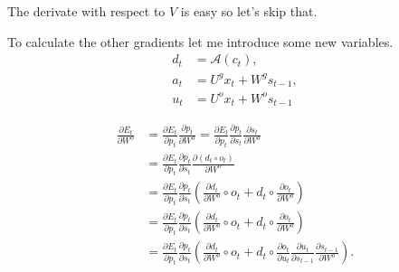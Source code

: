 \documentclass[12pt]{article}
\numberwithin{equation}{section}
\begin{document}
The derivate with respect to \(V\) is easy so let's skip that.

To calculate the other gradients let me introduce some new variables.
\begin{align}
d_t &= \mathcal{A}(c_t), \\
a_t &= U^gx_t + W^g s_{t-1}, \\
u_t &= U^o x_t + W^o s_{t-1}
\end{align}

\begin{align}
\frac{\partial E_t}{\partial W^o} &= \frac{\partial E_t}{\partial p_t}\frac{\partial p_t}{\partial W^o} = \frac{\partial E_t}{\partial p_t} \frac{\partial p_t}{\partial s_t}\frac{\partial s_t}{\partial W^o} \nonumber\\
&= \frac{\partial E_t}{\partial p_t} \frac{\partial p_t}{\partial s_t}\frac{\partial (d_t \circ o_t)}{\partial W^o} \nonumber \\
&= \frac{\partial E_t}{\partial p_t} \frac{\partial p_t}{\partial s_t}\left(\frac{\partial d_t }{\partial W^o}\circ o_t + d_t \circ \frac{\partial o_t}{\partial W^o}\right) \nonumber \\
&= \frac{\partial E_t}{\partial p_t} \frac{\partial p_t}{\partial s_t}\left(\frac{\partial d_t}{\partial W^o}\circ o_t + d_t \circ \frac{\partial o_t}{\partial W^o}\right) \nonumber \\
&= \frac{\partial E_t}{\partial p_t} \frac{\partial p_t}{\partial s_t}\left( \frac{\partial d_t}{\partial W^o}\circ o_t + d_t \circ \frac{\partial o_t}{\partial u_t}\frac{\partial u_t}{\partial s_{t-1}}\frac{\partial s_{t-1}}{\partial W^o}\right).
\end{align}
\end{document}
